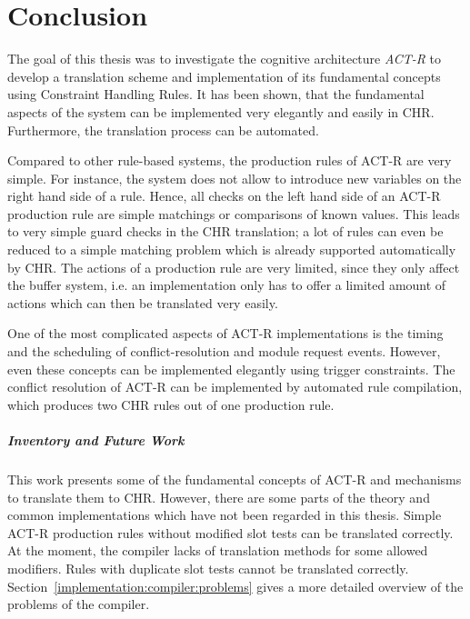 \chapter{Conclusion}
\label{conclusion}

The goal of this thesis was to investigate the cognitive architecture \emph{ACT-R} to develop a translation scheme and implementation of its fundamental concepts using Constraint Handling Rules. It has been shown, that the fundamental aspects of the system can be implemented very elegantly and easily in CHR. Furthermore, the translation process can be automated. 

Compared to other rule-based systems, the production rules of ACT-R are very simple. For instance, the system does not allow to introduce new variables on the right hand side of a rule. Hence, all checks on the left hand side of an ACT-R production rule are simple matchings or comparisons of known values. This leads to very simple guard checks in the CHR translation; a lot of rules can even be reduced to a simple matching problem which is already supported automatically by CHR. The actions of a production rule are very limited, since they only affect the buffer system, i.e. an implementation only has to offer a limited amount of actions which can then be translated very easily.

One of the most complicated aspects of ACT-R implementations is the timing and the scheduling of conflict-resolution and module request events. However, even these concepts can be implemented elegantly using trigger constraints. The conflict resolution of ACT-R can be implemented by automated rule compilation, which produces two CHR rules out of one production rule.

\paragraph{Inventory and Future Work}

This work presents some of the fundamental concepts of ACT-R and mechanisms to translate them to CHR. However, there are some parts of the theory and common implementations which have not been regarded in this thesis. Simple ACT-R production rules without modified slot tests can be translated correctly. At the moment, the compiler lacks of translation methods for some allowed modifiers. Rules with duplicate slot tests cannot be translated correctly. Section~\ref{implementation:compiler:problems} gives a more detailed overview of the problems of the compiler.

